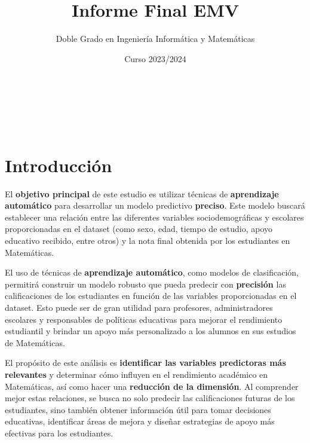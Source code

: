 \documentclass[a4paper, 11pt]{article}
\title{\textbf{Informe Final EMV}}  %
\date{Curso 2023/2024} %
\author{
	Doble Grado en Ingeniería Informática y Matemáticas
}
\makeatletter
\renewcommand{\maketitle}{
  \begin{flushright} %
  
  {\LARGE\@title} %
  \\ \@date %
  \vspace{50pt} %
  
  
  {\large\@author} %
  \\
  \vspace{40pt} %
  \end{flushright}
}
\makeatother
\begin{document}
\maketitle %
\pagebreak

\renewcommand{\abstractname}{Resumen} %



{\parskip=2pt
  \tableofcontents
}
\pagebreak


\section{Introducción}

El \textbf{objetivo principal} de este estudio es utilizar técnicas de \textbf{aprendizaje automático} para desarrollar un modelo predictivo \textbf{preciso}. Este modelo buscará establecer una relación entre las diferentes variables sociodemográficas y escolares proporcionadas en el dataset (como sexo, edad, tiempo de estudio, apoyo educativo recibido, entre otros) y la nota final obtenida por los estudiantes en Matemáticas.

El uso de técnicas de \textbf{aprendizaje automático}, como modelos de clasificación, permitirá construir un modelo robusto que pueda predecir con \textbf{precisión} las calificaciones de los estudiantes en función de las variables proporcionadas en el dataset. Esto puede ser de gran utilidad para profesores, administradores escolares y responsables de políticas educativas para mejorar el rendimiento estudiantil y brindar un apoyo más personalizado a los alumnos en sus estudios de Matemáticas.

El propósito de este análisis es \textbf{identificar las variables predictoras más relevantes} y determinar cómo influyen en el rendimiento académico en Matemáticas, así como hacer una \textbf{reducción de la dimensión}. Al comprender mejor estas relaciones, se busca no solo predecir las calificaciones futuras de los estudiantes, sino también obtener información útil para tomar decisiones educativas, identificar áreas de mejora y diseñar estrategias de apoyo más efectivas para los estudiantes.
\end{document}
